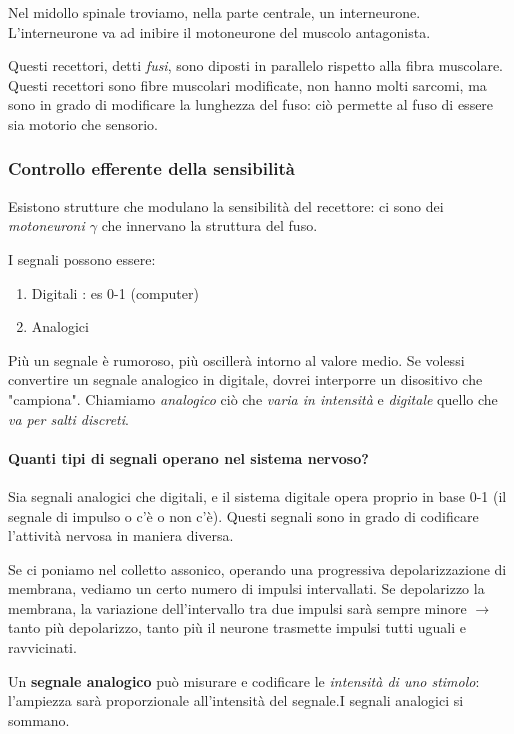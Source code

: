\documentclass[a4paper,12pt]{article}
\newcommand{\lfreccia}{\ensuremath{\longrightarrow}}
\begin{document}
Nel midollo spinale troviamo, nella parte centrale, un interneurone. L'interneurone va ad inibire il motoneurone del muscolo antagonista. 

Questi recettori, detti \emph{fusi}, sono diposti in parallelo rispetto alla fibra muscolare. Questi recettori sono fibre muscolari modificate, non hanno molti sarcomi, ma sono in grado di modificare la lunghezza del fuso: ciò permette al fuso di essere sia motorio che sensorio.

\subsubsection{Controllo efferente della sensibilità}
Esistono strutture che modulano la sensibilità del recettore: ci sono dei \emph{motoneuroni $\gamma$} che innervano la struttura del fuso.

I segnali possono essere:
\begin{enumerate}
\item{Digitali : es 0-1 (computer)}
\item{Analogici}
\end{enumerate}

Più un segnale è rumoroso, più oscillerà intorno al valore medio. Se volessi convertire un segnale analogico in digitale, dovrei interporre un disositivo che "campiona". Chiamiamo \emph{analogico} ciò che \emph{varia in intensità} e \emph{digitale} quello che \emph{va per salti discreti}.

\paragraph{Quanti tipi di segnali operano nel sistema nervoso?}

Sia segnali analogici che digitali, e il sistema digitale opera proprio in base 0-1 (il segnale di impulso o c'è o non c'è).
Questi segnali sono in grado di codificare l'attività nervosa in maniera diversa.

Se ci poniamo nel colletto assonico, operando una progressiva depolarizzazione di membrana, vediamo un certo numero di impulsi intervallati. Se depolarizzo la membrana, la variazione dell'intervallo tra due impulsi sarà sempre minore \lfreccia tanto più depolarizzo, tanto più il neurone trasmette impulsi tutti uguali e ravvicinati.

Un \textbf{segnale analogico} può misurare e codificare le \emph{intensità di uno stimolo}: l'ampiezza sarà proporzionale all'intensità del segnale.I segnali analogici si sommano.
\end{document}
